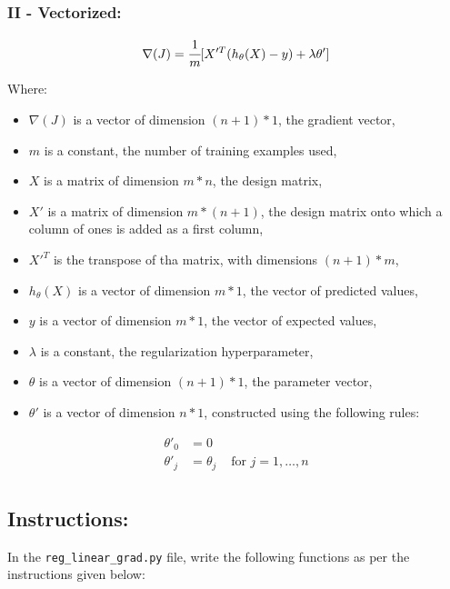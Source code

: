 \documentclass[]{article}
\begin{document}
\hypertarget{ii---vectorized-1}{%
\subsubsection{II - Vectorized:}\label{ii---vectorized-1}}

\large

\[
\nabla(J) = \cfrac{1}{m} [X'^T(h_\theta(X) - y) + \lambda \theta']
\] \normalsize

Where:

\begin{itemize}
\item
  \(\nabla(J)\) is a vector of dimension \((n + 1) * 1\), the gradient
  vector,
\item
  \(m\) is a constant, the number of training examples used,
\item
  \(X\) is a matrix of dimension \(m * n\), the design matrix,
\item
  \(X'\) is a matrix of dimension \(m * (n + 1)\), the design matrix
  onto which a column of ones is added as a first column,
\item
  \(X'^T\) is the transpose of tha matrix, with dimensions
  \((n + 1) * m\),
\item
  \(h_\theta(X)\) is a vector of dimension \(m * 1\), the vector of
  predicted values,
\item
  \(y\) is a vector of dimension \(m * 1\), the vector of expected
  values,
\item
  \(\lambda\) is a constant, the regularization hyperparameter,
\item
  \(\theta\) is a vector of dimension \((n + 1) * 1\), the parameter
  vector,
\item
  \(\theta'\) is a vector of dimension \(n * 1\), constructed using the
  following rules:
\end{itemize}

\large

\[
\begin{matrix}
\theta'_0 & =  0 \\
\theta'_j & =  \theta_j & \text{ for } j = 1, \dots, n\\    
\end{matrix}
\] \normalsize

\hypertarget{instructions-6}{%
\subsection{Instructions:}\label{instructions-6}}

In the \texttt{reg\_linear\_grad.py} file, write the following functions
as per the instructions given below:
\end{document}
